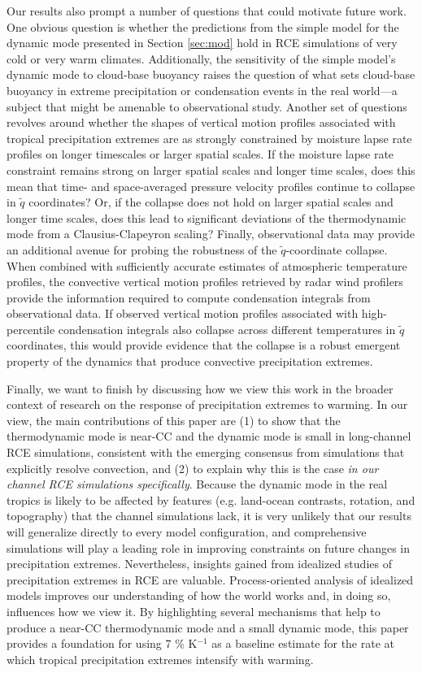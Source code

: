 \documentclass[twocol]{ametsoc}
\begin{document}
Our results also prompt a number of questions that could motivate future work. One obvious question is whether the predictions from the simple model for the dynamic mode presented in Section \ref{sec:mod} hold in RCE simulations of very cold or very warm climates. Additionally, the sensitivity of the simple model's dynamic mode to cloud-base buoyancy raises the question of what sets cloud-base buoyancy in extreme precipitation or condensation events in the real world---a subject that might be amenable to observational study. Another set of questions revolves around whether the shapes of vertical motion profiles associated with tropical precipitation extremes are as strongly constrained by moisture lapse rate profiles on longer timescales or larger spatial scales. If the moisture lapse rate constraint remains strong on larger spatial scales and longer time scales, does this mean that time- and space-averaged pressure velocity profiles continue to collapse in $\tilde{q}$ coordinates? Or, if the collapse does not hold on larger spatial scales and longer time scales, does this lead to significant deviations of the thermodynamic mode from a Clausius-Clapeyron scaling? Finally, observational data may provide an additional avenue for probing the robustness of the $\tilde{q}$-coordinate collapse. When combined with sufficiently accurate estimates of atmospheric temperature profiles, the convective vertical motion profiles retrieved by radar wind profilers provide the information required to compute condensation integrals from observational data. If observed vertical motion profiles associated with high-percentile condensation integrals also collapse across different temperatures in $\tilde{q}$ coordinates, this would provide evidence that the collapse is a robust emergent property of the dynamics that produce convective precipitation extremes.

Finally, we want to finish by discussing how we view this work in the broader context of research on the response of precipitation extremes to warming. In our view, the main contributions of this paper are (1) to show that the thermodynamic mode is near-CC and the dynamic mode is small in long-channel RCE simulations, consistent with the emerging consensus from simulations that explicitly resolve convection, and (2) to explain why this is the case {\it in our channel RCE simulations specifically}. Because the dynamic mode in the real tropics is likely to be affected by features (e.g. land-ocean contrasts, rotation, and topography) that the channel simulations lack, it is very unlikely that our results will generalize directly to every model configuration, and comprehensive simulations will play a leading role in improving constraints on future changes in precipitation extremes. Nevertheless, insights gained from idealized studies of precipitation extremes in RCE are valuable. Process-oriented analysis of idealized models improves our understanding of how the world works and, in doing so, influences how we view it. By highlighting several mechanisms that help to produce a near-CC thermodynamic mode and a small dynamic mode, this paper provides a foundation for using 7 \% K$^{-1}$ as a baseline estimate for the rate at which tropical precipitation extremes intensify with warming.
\end{document}
